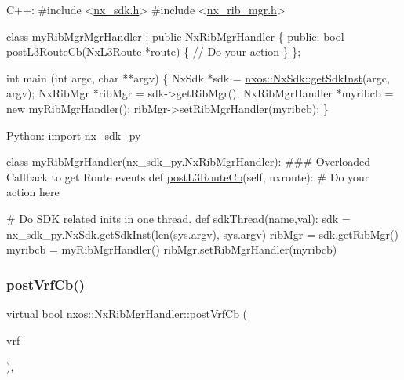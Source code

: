 \begin{DoxyCode}
C++:
\textcolor{preprocessor}{   #include <\mbox{\hyperlink{nx__sdk_8h}{nx\_sdk.h}}>}
\textcolor{preprocessor}{   #include <\mbox{\hyperlink{nx__rib__mgr_8h}{nx\_rib\_mgr.h}}>}

   \textcolor{keyword}{class }myRibMgrMgrHandler : \textcolor{keyword}{public} NxRibMgrHandler \{
      \textcolor{keyword}{public}:
         \textcolor{keywordtype}{bool} \mbox{\hyperlink{classnxos_1_1_nx_rib_mgr_handler_a1b742d50365fdece0ea47eb38300f7de}{postL3RouteCb}}(NxL3Route *route) \{
              \textcolor{comment}{// Do your action}
         \}
   \};

   \textcolor{keywordtype}{int}  main (\textcolor{keywordtype}{int} argc, \textcolor{keywordtype}{char} **argv)
   \{
        NxSdk    *sdk = \mbox{\hyperlink{classnxos_1_1_nx_sdk_a5050e2d26c40744b4fc7862068a83f39}{nxos::NxSdk::getSdkInst}}(argc, argv);
        NxRibMgr *ribMgr = sdk->getRibMgr();
        NxRibMgrHandler *myribcb = \textcolor{keyword}{new} myRibMgrHandler();
        ribMgr->setRibMgrHandler(myribcb);
   \}

Python:
   \textcolor{keyword}{import} nx\_sdk\_py

   \textcolor{keyword}{class }myRibMgrHandler(nx\_sdk\_py.NxRibMgrHandler):
\textcolor{preprocessor}{   ### Overloaded Callback to get Route events}
         def \mbox{\hyperlink{classnxos_1_1_nx_rib_mgr_handler_a1b742d50365fdece0ea47eb38300f7de}{postL3RouteCb}}(self, nxroute):
\textcolor{preprocessor}{             # Do your action here}

\textcolor{preprocessor}{   # Do SDK related inits in one thread.}
   def sdkThread(name,val):
       sdk = nx\_sdk\_py.NxSdk.getSdkInst(len(sys.argv), sys.argv)
       ribMgr = sdk.getRibMgr()
       myribcb = myRibMgrHandler()
       ribMgr.setRibMgrHandler(myribcb)
\end{DoxyCode}
 \mbox{\label{classnxos_1_1_nx_rib_mgr_handler_a2ed5a3ad9c0e55d21e18d88a19419a5e}} 
\subsubsection{\texorpdfstring{post\+Vrf\+Cb()}{postVrfCb()}}
{\footnotesize\ttfamily virtual bool nxos\+::\+Nx\+Rib\+Mgr\+Handler\+::post\+Vrf\+Cb (\begin{DoxyParamCaption}\item[{\mbox{\hyperlink{classnxos_1_1_nx_vrf}{Nx\+Vrf}} $\ast$}]{vrf }\end{DoxyParamCaption})\hspace{0.3cm}{\ttfamily [inline]}, {\ttfamily [virtual]}}

